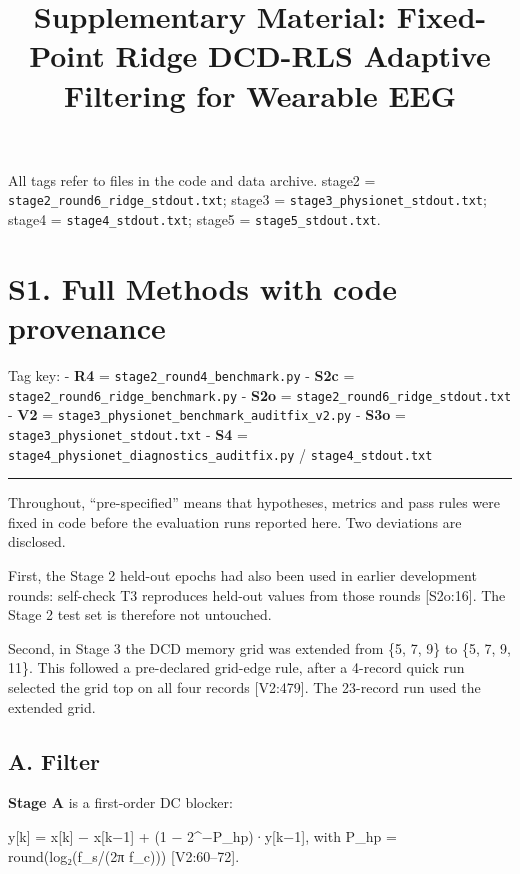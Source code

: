 \documentclass[
  9pt,
]{article}
\title{Supplementary Material: Fixed-Point Ridge DCD-RLS Adaptive
Filtering for Wearable EEG}
\author{}
\date{}
\begin{document}
\maketitle

All tags refer to files in the code and data archive. stage2 =
\texttt{stage2\_round6\_ridge\_stdout.txt}; stage3 =
\texttt{stage3\_physionet\_stdout.txt}; stage4 =
\texttt{stage4\_stdout.txt}; stage5 = \texttt{stage5\_stdout.txt}.

\hypertarget{s1.-full-methods-with-code-provenance}{%
\section{S1. Full Methods with code
provenance}\label{s1.-full-methods-with-code-provenance}}

Tag key: - \textbf{R4} = \texttt{stage2\_round4\_benchmark.py} -
\textbf{S2c} = \texttt{stage2\_round6\_ridge\_benchmark.py} -
\textbf{S2o} = \texttt{stage2\_round6\_ridge\_stdout.txt} - \textbf{V2}
= \texttt{stage3\_physionet\_benchmark\_auditfix\_v2.py} - \textbf{S3o}
= \texttt{stage3\_physionet\_stdout.txt} - \textbf{S4} =
\texttt{stage4\_physionet\_diagnostics\_auditfix.py} /
\texttt{stage4\_stdout.txt}

\begin{center}\rule{0.5\linewidth}{0.5pt}\end{center}

Throughout, ``pre-specified'' means that hypotheses, metrics and pass
rules were fixed in code before the evaluation runs reported here. Two
deviations are disclosed.

First, the Stage 2 held-out epochs had also been used in earlier
development rounds: self-check T3 reproduces held-out values from those
rounds {[}S2o:16{]}. The Stage 2 test set is therefore not untouched.

Second, in Stage 3 the DCD memory grid was extended from \{5, 7, 9\} to
\{5, 7, 9, 11\}. This followed a pre-declared grid-edge rule, after a
4-record quick run selected the grid top on all four records
{[}V2:479{]}. The 23-record run used the extended grid.

\hypertarget{a.-filter}{%
\subsection{A. Filter}\label{a.-filter}}

\textbf{Stage A} is a first-order DC blocker:

y{[}k{]} = x{[}k{]} − x{[}k−1{]} + (1 − 2\^{}−P\_hp)·y{[}k−1{]}, with
P\_hp = round(log₂(f\_s/(2π f\_c))) {[}V2:60--72{]}.
\end{document}
